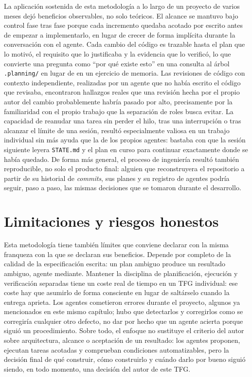 La aplicación sostenida de esta metodología a lo largo de un proyecto de varios meses dejó
beneficios observables, no solo teóricos. El alcance se mantuvo bajo control fase tras fase
porque cada incremento quedaba acotado por escrito antes de empezar a implementarlo, en lugar
de crecer de forma implícita durante la conversación con el agente. Cada cambio del código es
trazable hasta el plan que lo motivó, el requisito que lo justificaba y la evidencia que lo
verificó, lo que convierte una pregunta como \enquote{por qué existe esto} en una consulta al
árbol \texttt{.planning/} en lugar de en un ejercicio de memoria. Las revisiones de código con
contexto independiente, realizadas por un agente que no había escrito el código que revisaba,
encontraron hallazgos reales que una revisión hecha por el propio autor del cambio
probablemente habría pasado por alto, precisamente por la familiaridad con el propio trabajo
que la separación de roles busca evitar. La capacidad de reanudar una tarea sin perder el hilo,
tras una interrupción o tras alcanzar el límite de una sesión, resultó especialmente valiosa en
un trabajo individual sin más ayuda que la de los propios agentes: bastaba con que la sesión
siguiente leyera \texttt{STATE.md} y el plan en curso para continuar exactamente donde se había
quedado. De forma más general, el proceso de ingeniería resultó también reproducible, no solo
el producto final: alguien que reconstruyera el repositorio a partir de su historial de
\textit{commits}, sus planes y su registro de agentes podría seguir, paso a paso, las mismas
decisiones que se tomaron durante el desarrollo.

\section{Limitaciones y riesgos honestos}\label{sec:gestion-limitaciones}

Esta metodología tiene también límites que conviene declarar con la misma franqueza con la que
se declaran sus beneficios. Depende por completo de la calidad de la especificación escrita: un
plan ambiguo produce un resultado ambiguo, agente mediante. Mantener la disciplina de
planificación, ejecución y verificación separadas tiene un coste real de tiempo en un TFG
individual: ese coste hay que asumirlo de forma consciente en lugar de saltárselo cuando la
entrega aprieta. Los agentes cometieron errores durante el proyecto, algunos ya mencionados en
este mismo capítulo; hubo que detectarlos y corregirlos como se corregiría cualquier otro
defecto, no dar por hecho que un agente acierta porque siguió un procedimiento. Sobre todo, el
enfoque no sustituye el criterio del autor sobre arquitectura, alcance o
aceptación de un resultado: los agentes proponen, ejecutan tareas acotadas y comprueban
condiciones automatizables, pero la decisión final de qué construir, cómo construirlo y cuándo
darlo por bueno siguió siendo, en todo momento, una decisión del autor de este TFG.

